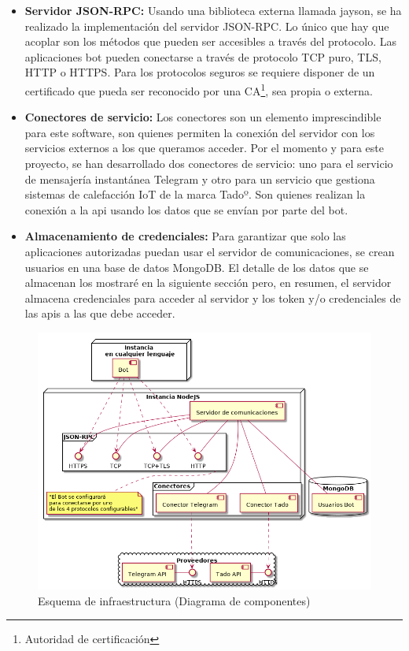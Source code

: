 \documentclass[spanish,12pt, a4paper, twoside]{paper}
\begin{document}
\begin{itemize}
\item \textbf{Servidor JSON-RPC:} Usando una biblioteca externa llamada jayson, se ha realizado la implementación del servidor JSON-RPC. Lo único que hay que acoplar son los métodos que pueden ser accesibles a través del protocolo. Las aplicaciones bot pueden conectarse a través de protocolo TCP puro, TLS, HTTP o HTTPS. Para los protocolos seguros se requiere disponer de un certificado que pueda ser reconocido por una CA\footnote{Autoridad de certificación}, sea propia o externa.

\item \textbf{Conectores de servicio:} Los conectores son un elemento imprescindible para este software, son quienes permiten la conexión del servidor con los servicios externos a los que queramos acceder. Por el momento y para este proyecto, se han desarrollado dos conectores de servicio: uno para el servicio de mensajería instantánea Telegram y otro para un servicio que gestiona sistemas de calefacción IoT de la marca Tadoº. Son quienes realizan la conexión a la api usando los datos que se envían por parte del bot.

\item \textbf{Almacenamiento de credenciales:} Para garantizar que solo las aplicaciones autorizadas puedan usar el servidor de comunicaciones, se crean usuarios en una base de datos MongoDB. El detalle de los datos que se almacenan los mostraré en la siguiente sección pero, en resumen, el servidor almacena credenciales para acceder al servidor y los token y/o credenciales de las apis a las que debe acceder.
\end{itemize}

\begin{figure}
\centering
	\includegraphics[width=\textwidth]{recursos/component}
\caption{Esquema de infraestructura (Diagrama de componentes)}
\label{fig:Infraestructura de nodos}
\end{figure}
\end{document}
